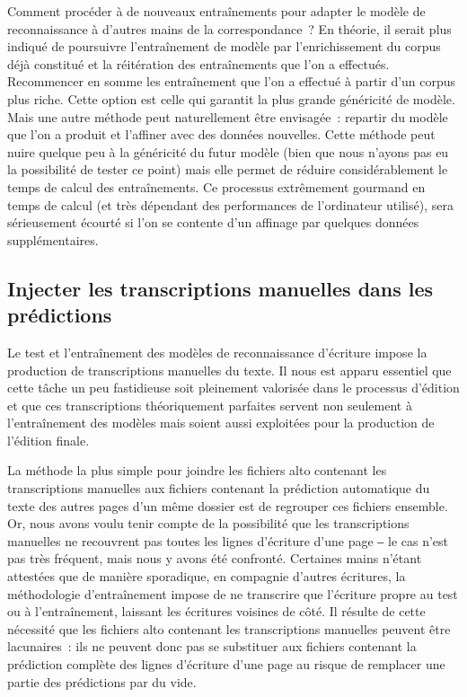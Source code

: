 \documentclass[a4paper,12pt,twoside]{book}
\begin{document}
				Comment procéder à de nouveaux entraînements pour adapter le modèle de reconnaissance à d'autres mains de la correspondance~? En théorie, il serait plus indiqué de poursuivre l'entraînement de modèle par l'enrichissement du corpus déjà constitué et la réitération des entraînements que l'on a effectués. Recommencer en somme les entraînement que l'on a effectué à partir d'un corpus plus riche. Cette option est celle qui garantit la plus grande généricité de modèle. Mais une autre méthode peut naturellement être envisagée~: repartir du modèle que l'on a produit et l'affiner avec des données nouvelles. Cette méthode peut nuire quelque peu à la généricité du futur modèle (bien que nous n'ayons pas eu la possibilité de tester ce point) mais elle permet de réduire considérablement le temps de calcul des entraînements. Ce processus extrêmement gourmand en temps de calcul (et très dépendant des performances de l'ordinateur utilisé), sera sérieusement écourté si l'on se contente d'un affinage par quelques données supplémentaires.
							
			\subsection{Injecter les transcriptions manuelles dans les prédictions}
				\label{injection}
				Le test et l'entraînement des modèles de reconnaissance d'écriture impose la production de transcriptions manuelles du texte. Il nous est apparu essentiel que cette tâche un peu fastidieuse soit pleinement valorisée dans le processus d'édition et que ces transcriptions théoriquement parfaites servent non seulement à l'entraînement des modèles mais soient aussi exploitées pour la production de l'édition finale.
				
				La méthode la plus simple pour joindre les fichiers \gls{alto} contenant les transcriptions manuelles aux fichiers contenant la prédiction automatique du texte des autres pages d'un même dossier est de regrouper ces fichiers ensemble. Or, nous avons voulu tenir compte de la possibilité que les transcriptions manuelles ne recouvrent pas toutes les lignes d'écriture d'une page ‒ le cas n'est pas très fréquent, mais nous y avons été confronté. Certaines mains n'étant attestées que de manière sporadique, en compagnie d'autres écritures, la méthodologie d'entraînement impose de ne transcrire que l'écriture propre au test ou à l'entraînement, laissant les écritures voisines de côté. Il résulte de cette nécessité que les fichiers \gls{alto} contenant les transcriptions manuelles peuvent être lacunaires~: ils ne peuvent donc pas se substituer aux fichiers contenant la prédiction complète des lignes d'écriture d'une page au risque de remplacer une partie des prédictions par du vide. 
				
\end{document}
